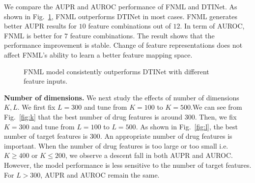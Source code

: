 \documentclass[conference]{IEEEtran}
\begin{document}
We compare the AUPR and AUROC performance of FNML and DTINet. As shown in Fig.~\ref{fig:stability}, FNML outperforms DTINet in most cases. FNML generates better AUPR results for $10$ feature combinations out of $12$. In term of AUROC, FNML is better for $7$ feature combinations. The result shows that the performance improvement is stable. Change of feature representations does not affect FNML's ability to learn a better feature mapping space.

\begin{figure}[!ht]
\centering
{}

\vspace*{-10pt}
\caption{FNML model consistently outperforms DTINet with different feature inputs.}\label{fig:stability}
\end{figure}



\textbf{Number of dimensions.}  We next study the effects of number of dimensions $K,L$. We first fix $L=300$ and tune from $K=100$ to $K=500$.We can see from Fig.~\ref{fig:k} that the best number of drug features is around $300$. Then, we fix $K=300$ and tune from $L=100$ to $L=500$. As shown in Fig.~\ref{fig:l}, the best number of target features is $300$. An appropriate number of drug features is important. When the number of drug features is too large or too small i.e. $K\ge400$ or $K\le200$, we observe a descent fall in both AUPR and AUROC. However, the model performance is less sensitive to the number of target features. For $L>300$, AUPR and AUROC remain the same.   
\end{document}

